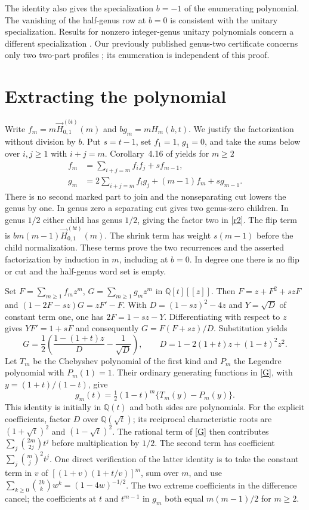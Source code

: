 \documentclass[11pt]{article}
\begin{document}
The identity also gives the specialization $b=-1$ of the enumerating polynomial. The vanishing of the half-genus row at $b=0$ is consistent with the unitary specialization. Results for nonzero integer-genus unitary polynomials concern a different specialization \cite{cdm}. Our previously published genus-two certificate concerns only two two-part profiles \cite{two}; its enumeration is independent of this proof.

\section{Extracting the polynomial}
Write $f_m=m\vec H_{0,1}^{(bt)}(m)$ and $b g_m=mH_m(b,t)$. We justify the factorization without division by $b$. Put $s=t-1$, set $f_1=1$, $g_1=0$, and take the sums below over $i,j\ge1$ with $i+j=m$. Corollary~4.16 of \cite{cd} yields for $m\ge2$
\begin{align}
 f_m&=\sum_{i+j=m} f_i f_j+s f_{m-1},\label{r1}\\
 g_m&=2\sum_{i+j=m} f_i g_j+(m-1) f_m+s g_{m-1}.\label{r2}
\end{align}
There is no second marked part to join and the nonseparating cut lowers the genus by one. In genus zero a separating cut gives two genus-zero children. In genus $1/2$ either child has genus $1/2$, giving the factor two in \eqref{r2}. The flip term is $b m(m-1)\vec H_{0,1}^{(bt)}(m)$. The shrink term has weight $s(m-1)$ before the child normalization. These terms prove the two recurrences and the asserted factorization by induction in $m$, including at $b=0$. In degree one there is no flip or cut and the half-genus word set is empty.

Set $F=\sum_{m\ge1} f_m z^m$, $G=\sum_{m\ge1} g_m z^m$ in $\mathbb Q[t][[z]]$. Then $F=z+F^2+szF$ and $(1-2F-sz)G=zF'-F$. With $D=(1-sz)^2-4z$ and $Y=\sqrt D$ of constant term one, one has $2F=1-sz-Y$. Differentiating with respect to $z$ gives $YF'=1+sF$ and consequently $G=F(F+sz)/D$. Substitution yields
\begin{equation}\label{G}
 G=\frac12\left(\frac{1-(1+t)z}{D}-\frac1{\sqrt D}\right),\qquad
 D=1-2(1+t)z+(1-t)^2z^2 .
\end{equation}
Let $T_m$ be the Chebyshev polynomial of the first kind and $P_m$ the Legendre polynomial with $P_m(1)=1$. Their ordinary generating functions in \eqref{G}, with $y=(1+t)/(1-t)$, give
\begin{equation}\label{pull}
 g_m(t)=\tfrac12(1-t)^m\{T_m(y)-P_m(y)\}.
\end{equation}
This identity is initially in $\mathbb Q(t)$ and both sides are polynomials. For the explicit coefficients, factor $D$ over $\mathbb Q(\sqrt t)$; its reciprocal characteristic roots are $(1+\sqrt t)^2$ and $(1-\sqrt t)^2$. The rational term of \eqref{G} then contributes $\sum_j\binom{2m}{2j}t^j$ before multiplication by $1/2$. The second term has coefficient $\sum_j\binom mj^2t^j$. One direct verification of the latter identity is to take the constant term in $v$ of $[(1+v)(1+t/v)]^m$, sum over $m$, and use $\sum_{k\ge0}\binom{2k}{k}w^k=(1-4w)^{-1/2}$. The two extreme coefficients in the difference cancel; the coefficients at $t$ and $t^{m-1}$ in $g_m$ both equal $m(m-1)/2$ for $m\ge2$.
\end{document}
